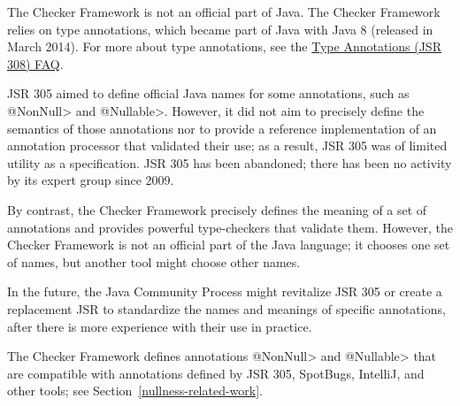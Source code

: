 
The Checker Framework is not an official part of Java.
The Checker Framework relies on type annotations, which became part of Java
with Java 8 (released in March 2014).  For more about type annotations, see the
\href{https://checkerframework.org/jsr308/jsr308-faq.html#pluggable-type-checking-in-java}{Type
  Annotations (JSR 308) FAQ}.



JSR 305 aimed to define official Java names for some annotations, such as
\<@NonNull> and \<@Nullable>.  However, it did not aim to precisely define
the semantics of those annotations nor to provide a reference
implementation of an annotation processor that validated their use;
as a result, JSR 305 was of limited utility as a specification.
JSR 305 has been abandoned; there has been
no activity by its expert group since
2009.

By contrast, the Checker Framework precisely defines the meaning of a set
of annotations and provides powerful type-checkers that validate them.
However, the Checker Framework is not an official part of the Java
language; it chooses one set of names, but another tool might choose other
names.

In the future, the Java Community Process might revitalize JSR 305 or
create a replacement JSR to standardize the names and
meanings of specific annotations, after there is more experience with their
use in practice.



The Checker Framework defines annotations \<@NonNull> and \<@Nullable> that
are compatible with annotations defined by JSR 305, SpotBugs, IntelliJ, and
other tools; see Section~\ref{nullness-related-work}.


